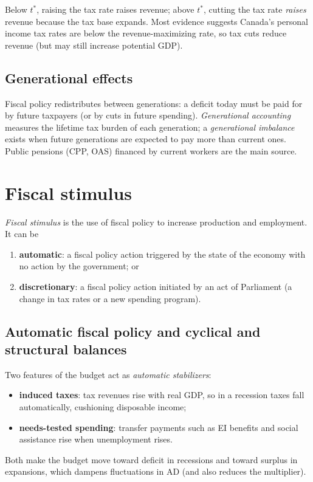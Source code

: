 Below $t^{*}$, raising the tax rate raises revenue; above $t^{*}$, cutting the tax rate
\emph{raises} revenue because the tax base expands. Most evidence suggests Canada's
personal income tax rates are below the revenue-maximizing rate, so tax cuts reduce
revenue (but may still increase potential GDP).

\subsection{Generational effects}

Fiscal policy redistributes between generations: a deficit today must be paid for by
future taxpayers (or by cuts in future spending). \emph{Generational accounting} measures
the lifetime tax burden of each generation; a \emph{generational imbalance} exists when
future generations are expected to pay more than current ones. Public pensions (CPP, OAS)
financed by current workers are the main source.

\section{Fiscal stimulus}

\begin{definition}
\emph{Fiscal stimulus} is the use of fiscal policy to increase production and employment.
It can be
\begin{enumerate}
  \item \textbf{automatic}: a fiscal policy action triggered by the state of the economy
        with no action by the government; or
  \item \textbf{discretionary}: a fiscal policy action initiated by an act of Parliament
        (a change in tax rates or a new spending program).
\end{enumerate}
\end{definition}

\subsection{Automatic fiscal policy and cyclical and structural balances}

Two features of the budget act as \emph{automatic stabilizers}:
\begin{itemize}
  \item \textbf{induced taxes}: tax revenues rise with real GDP, so in a recession taxes
        fall automatically, cushioning disposable income;
  \item \textbf{needs-tested spending}: transfer payments such as EI benefits and social
        assistance rise when unemployment rises.
\end{itemize}
Both make the budget move toward deficit in recessions and toward surplus in expansions,
which dampens fluctuations in AD (and also reduces the multiplier).

